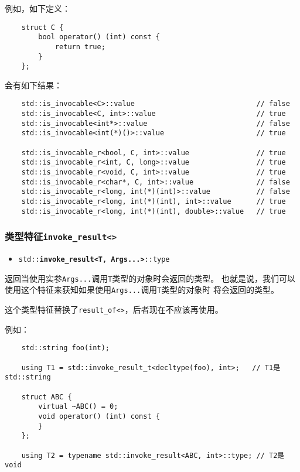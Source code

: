 例如，如下定义：
\begin{lstlisting}
    struct C {
        bool operator() (int) const {
            return true;
        }
    };
\end{lstlisting}
会有如下结果：
\begin{lstlisting}
    std::is_invocable<C>::value                             // false
    std::is_invocable<C, int>::value                        // true
    std::is_invocable<int*>::value                          // false
    std::is_invocable<int(*)()>::value                      // true

    std::is_invocable_r<bool, C, int>::value                // true
    std::is_invocable_r<int, C, long>::value                // true
    std::is_invocable_r<void, C, int>::value                // true
    std::is_invocable_r<char*, C, int>::value               // false
    std::is_invocable_r<long, int(*)(int)>::value           // false
    std::is_invocable_r<long, int(*)(int), int>::value      // true
    std::is_invocable_r<long, int(*)(int), double>::value   // true
\end{lstlisting}

\subsubsection{类型特征\texttt{invoke\_result<>}}\label{ch21.2.0.5}
\begin{itemize}
    \item[] \texttt{std::\textbf{invoke\_result<T, Args...>}::type}
\end{itemize}
返回当使用实参\texttt{Args...}调用\texttt{T}类型的对象时会返回的类型。
也就是说，我们可以使用这个特征来获知如果使用\texttt{Args...}调用\texttt{T}类型的对象时
将会返回的类型。

这个类型特征替换了\texttt{result\_of<>}，后者现在不应该再使用。

例如：
\begin{lstlisting}
    std::string foo(int);

    using T1 = std::invoke_result_t<decltype(foo), int>;   // T1是std::string

    struct ABC {
        virtual ~ABC() = 0;
        void operator() (int) const {
        }
    };

    using T2 = typename std::invoke_result<ABC, int>::type; // T2是void
\end{lstlisting}


